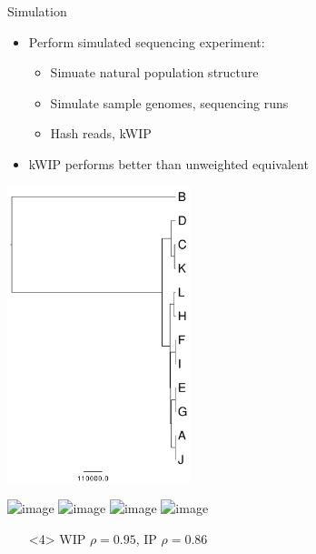 \documentclass[t]{beamer}
\begin{document}
\begin{frame}{Simulation}
  \begin{itemize}
    \item Perform simulated sequencing experiment:
    \begin{itemize}
      \item Simuate natural population structure
      \item Simulate sample genomes, sequencing runs
      \item Hash reads, kWIP
    \end{itemize}
    \item kWIP performs better than unweighted equivalent
  \end{itemize}
  \begin{center}
    \includegraphics[width=0.4\textwidth]{img/sampletree.pdf}
  \end{center}
\end{frame}

\begin{frame}
  \begin{center}
    \includegraphics<1>[width=\textwidth]{img/Truth-mat.png}
    \includegraphics<2>[width=\textwidth]{img/WIP-mat.png}
    \includegraphics<3>[width=\textwidth]{img/IP-mat.png}
    \includegraphics<4>[width=\textwidth]{img/WIPvsIPvsTruth.png}
    \begin{itemize}
      \item[] <4> WIP $\rho = 0.95$, IP $\rho = 0.86$
    \end{itemize}
  \end{center}
\end{frame}
\end{document}
